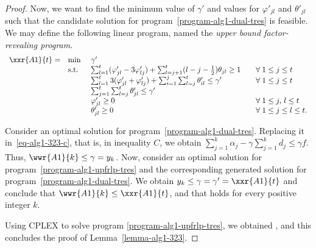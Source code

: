 \begin{proof}
Now, we want to find the minimum value of $\gamma'$ and values for $\varphi'_{jl}$ and
$\theta'_{jl}$ such that the candidate solution for program~\eqref{program-alg1-dual-tres}
is feasible. We may define the following linear program,
named the \emph{upper bound factor-revealing program}.
\begin{equation}\label{program-alg1-upfrlp-tres}
\begin{array}{rllll}
\xxr{A1}{t} = & \mbox{\rm min }   & \gamma'  \\
      & \mbox{\rm s.t.}  & \sum_{l=1}^{t} (\varphi'_{jl} - 3 \varphi'_{lj})
                               + \sum_{l=j + 1}^{t} (l - j - \frac{1}{2}) \theta_{jl} \ge 1
                               & \quad \forall \; 1 \le j \le t \\
      &                        & \sum_{l=1}^{t} 3 (\varphi'_{j l} + \varphi'_{l j})
                               + \sum_{i=1}^{j} \sum_{l = j}^{t} \theta'_{il}   \le \gamma'
                               & \quad \forall \; 1 \le j \le t \\
      &                        & \sum_{j=1}^{t} \sum_{l = j}^{t} \theta'_{jl} \le \gamma'
                               & \\
      &                        & \varphi'_{jl} \ge 0
                               & \quad \forall \; 1 \le j, \, l \le t \\
      &                        & \theta'_{jl} \ge 0
                               & \quad \forall \; 1 \le j  \le l \le t.
\end{array}
\end{equation}

Consider an optimal solution for program~\eqref{program-alg1-dual-tres}.
Replacing it in~\eqref{eq-alg1-323-c}, that is, in inequality $C$, we obtain
$\sum_{j=1}^{k} \alpha_j - \gamma \sum_{j=1}^{k} d_j \le \gamma f$. Thus,
$\wwr{A1}{k} \le \gamma = y_k$. Now, consider an optimal solution for
program~\eqref{program-alg1-upfrlp-tres} and the corresponding generated
solution for program~\eqref{program-alg1-dual-tres}. We obtain $y_k \le \gamma =
\gamma' = \xxr{A1}{t}$ and conclude that $\wwr{A1}{k} \le \xxr{A1}{t}$, 
and that holds for every positive integer $k$.

Using CPLEX to solve program \eqref{program-alg1-upfrlp-tres}, we obtained
, and this concludes the proof
of Lemma~\ref{lemma-alg1-323}.
\end{proof}
 






